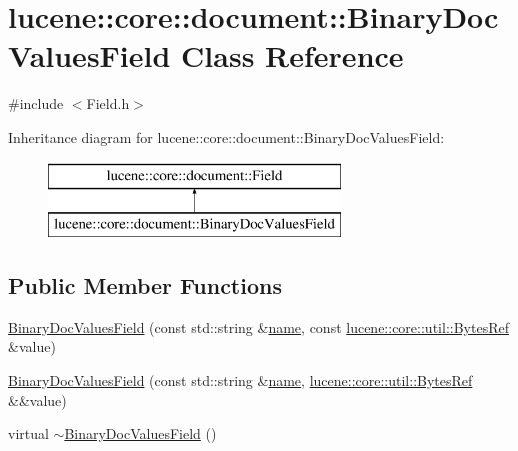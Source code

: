 \hypertarget{classlucene_1_1core_1_1document_1_1BinaryDocValuesField}{}\section{lucene\+:\+:core\+:\+:document\+:\+:Binary\+Doc\+Values\+Field Class Reference}
\label{classlucene_1_1core_1_1document_1_1BinaryDocValuesField}


{\ttfamily \#include $<$Field.\+h$>$}

Inheritance diagram for lucene\+:\+:core\+:\+:document\+:\+:Binary\+Doc\+Values\+Field\+:\begin{figure}[H]
\begin{center}
\leavevmode
\includegraphics[height=2.000000cm]{classlucene_1_1core_1_1document_1_1BinaryDocValuesField}
\end{center}
\end{figure}
\subsection*{Public Member Functions}
\begin{DoxyCompactItemize}
\item 
\mbox{\hyperlink{classlucene_1_1core_1_1document_1_1BinaryDocValuesField_ab25498388b61dec98a2a1bf9b4f73e92}{Binary\+Doc\+Values\+Field}} (const std\+::string \&\mbox{\hyperlink{classlucene_1_1core_1_1document_1_1Field_a52f673f3b3abb14b180f5159f4726537}{name}}, const \mbox{\hyperlink{classlucene_1_1core_1_1util_1_1BytesRef}{lucene\+::core\+::util\+::\+Bytes\+Ref}} \&value)
\item 
\mbox{\hyperlink{classlucene_1_1core_1_1document_1_1BinaryDocValuesField_aaa2e860c28eb16a67e2a2c54a6180238}{Binary\+Doc\+Values\+Field}} (const std\+::string \&\mbox{\hyperlink{classlucene_1_1core_1_1document_1_1Field_a52f673f3b3abb14b180f5159f4726537}{name}}, \mbox{\hyperlink{classlucene_1_1core_1_1util_1_1BytesRef}{lucene\+::core\+::util\+::\+Bytes\+Ref}} \&\&value)
\item 
virtual \mbox{\hyperlink{classlucene_1_1core_1_1document_1_1BinaryDocValuesField_a1b1c95249624a9e4f78d8a213dbec948}{$\sim$\+Binary\+Doc\+Values\+Field}} ()
\end{DoxyCompactItemize}
